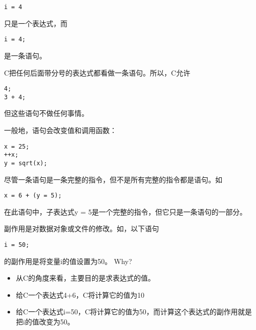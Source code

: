 \begin{frame}[fragile]
\begin{lstlisting}[backgroundcolor=\color{red!10}]
i = 4
\end{lstlisting}
只是一个表达式，而
\begin{lstlisting}[backgroundcolor=\color{red!10}]
i = 4;
\end{lstlisting}
是一条语句。

\end{frame}

\begin{frame}[fragile]
C把任何后面带分号的表达式都看做一条语句。所以，C允许
\begin{lstlisting}[backgroundcolor=\color{red!10}]
4;
3 + 4; 
\end{lstlisting}
但这些语句不做任何事情。
\end{frame}

\begin{frame}[fragile]
一般地，语句会改变值和调用函数：
\begin{lstlisting}[backgroundcolor=\color{red!10}]
x = 25;
++x;
y = sqrt(x); 
\end{lstlisting}
\end{frame}

\begin{frame}[fragile]
尽管一条语句是一条完整的指令，但不是所有完整的指令都是语句。如
\begin{lstlisting}[backgroundcolor=\color{red!10}]
x = 6 + (y = 5); 
\end{lstlisting}
在此语句中，子表达式y = 5是一个完整的指令，但它只是一条语句的一部分。
\end{frame}

\begin{frame}

\end{frame}


\begin{frame}[fragile]
  副作用是对数据对象或文件的修改。\tf  如，以下语句
  \begin{lstlisting}[backgroundcolor=\color{red!10}]
i = 50;
  \end{lstlisting}
  的副作用是将变量i的值设置为50。\pause 
\textcolor{acolor3}{\Huge Why? } \pause 
\vspace{0.1in} 

\begin{itemize}
\item
从C的角度来看，主要目的是求表达式的值。\\[0.1in]
\item 给C一个表达式4+6，C将计算它的值为10\\[0.1in]
\item 给C一个表达式i=50，C将计算它的值为50，而计算这个表达式的副作用就是把i的值改变为50。
\end{itemize}

\end{frame}

